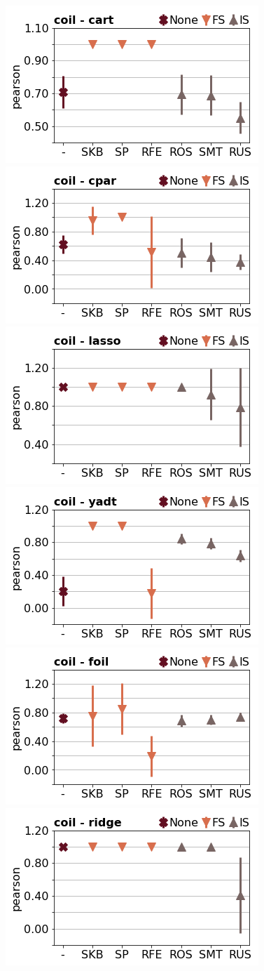 \documentclass[runningheads,a4paper]{llncs}
\begin{document}
\begin{figure}[!h]
\includegraphics[width=0.32\linewidth]{fig/preps_coil2000_DT_sklearn_sample_pearson.png}
\includegraphics[width=0.32\linewidth]{fig/preps_coil2000_RB_cpar_sample_pearson.png}
\includegraphics[width=0.32\linewidth]{fig/preps_coil2000_LM_lasso_sample_pearson.png}
\includegraphics[width=0.32\linewidth]{fig/preps_coil2000_DT_yadt_sample_pearson.png}
\includegraphics[width=0.32\linewidth]{fig/preps_coil2000_RB_foil_sample_pearson.png}
\includegraphics[width=0.32\linewidth]{fig/preps_coil2000_LM_ridge_sample_pearson.png}
\end{figure}
\end{document}
